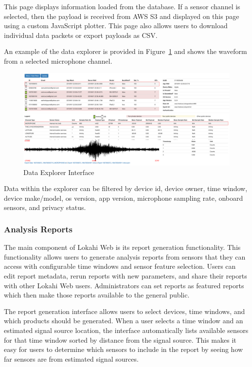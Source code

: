 This page displays information loaded from the database. If a sensor channel is selected, then the payload is received from AWS S3 and displayed on this page using a custom JavaScript plotter. This page also allows users to download individual data packets or export payloads as CSV\@.

An example of the data explorer is provided in Figure~\ref{fig:lweb_dataexplorer} and shows the waveform from a selected microphone channel.

\begin{figure}
	\centering
	\includegraphics[width=0.7\linewidth]{figures/lweb_dataexplorer.png}
	\caption{Data Explorer Interface}
	\label{fig:lweb_dataexplorer}
\end{figure}

Data within the explorer can be filtered by device id, device owner, time window, device make/model, os version, app version, microphone sampling rate, onboard sensors, and privacy status.

\subsubsection{Analysis Reports}
The main component of Lokahi Web is its report generation functionality. This functionality allows users to generate analysis reports from sensors that they can access with configurable time windows and sensor feature selection. Users can edit report metadata, rerun reports with new parameters, and share their reports with other Lokahi Web users. Administrators can set reports as featured reports which then make those reports available to the general public.

The report generation interface allows users to select devices, time windows, and which products should be generated. When a user selects a time window and an estimated signal source location, the interface automatically lists available sensors for that time window sorted by distance from the signal source. This makes it easy for users to determine which sensors to include in the report by seeing how far sensors are from estimated signal sources.

